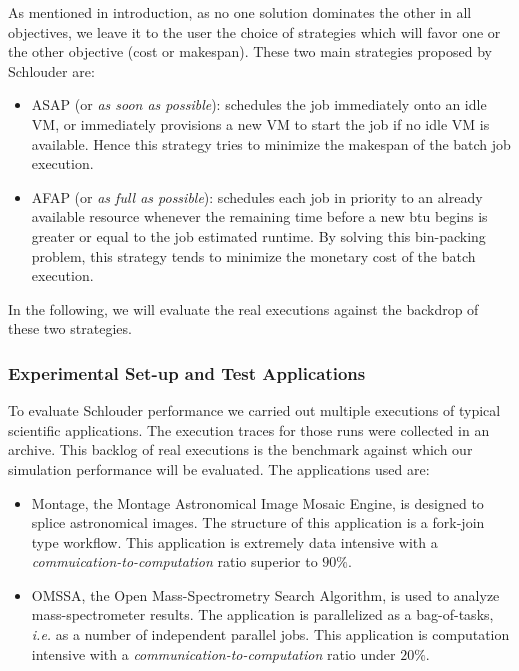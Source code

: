 \documentclass[10pt,conference,compsocconf]{IEEEtran}
\begin{document}
As mentioned  in introduction,  as no  one solution dominates  the other  in all
objectives, we leave  it to the user  the choice of strategies  which will favor
one  or the  other  objective  (cost or  makespan).  These  two main  strategies
proposed by Schlouder are:
\begin{itemize}
\item ASAP (or \textit{as soon as possible}): schedules the job immediately onto
  an idle VM, or immediately provisions a new VM to start the job if no idle VM 
  is available.  Hence this strategy tries to minimize the makespan
  of the batch job execution.

\item AFAP (or \textit{as full as  possible}): schedules each job in priority to
	an already available resource whenever the remaining time  before a new
	\ac{btu} begins is greater or equal to the job estimated runtime.
	By solving this bin-packing problem, this strategy tends to minimize the
	monetary cost of the batch execution.
\end{itemize}
In the following,  we will evaluate the real executions  against the backdrop of
these two strategies.

\subsubsection{Experimental Set-up and Test Applications}\label{sc:setup}

To evaluate Schlouder performance we carried out multiple executions of
typical scientific applications. The execution traces for those runs were
collected in an archive. This backlog of real executions is the benchmark
against which our simulation performance will be evaluated. The applications
used are:

\begin{itemize}
	\item Montage\cite{montage2009}, the Montage Astronomical Image Mosaic
		Engine, is designed to splice astronomical images. The structure
                of this application is a fork-join type workflow. This
                application  is extremely data intensive with a
		\emph{commuication-to-computation} ratio superior to $90\%$.
	\item OMSSA\cite{Geer2004}, the Open Mass-Spectrometry Search Algorithm, 
		is used to analyze mass-spectrometer results. The application is
                parallelized as a bag-of-tasks, \textit{i.e.} as a number of
                independent parallel jobs. This application is
		computation intensive with a
		\emph{communication-to-computation} ratio under $20\%$.
\end{itemize}

\end{document}
